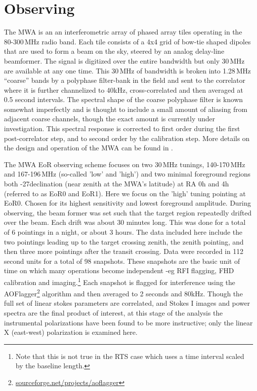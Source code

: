\documentclass[preprint]{aastex}
\begin{document}
\section{Observing}
\label{sec:observing}
The MWA is an an interferometric array of phased array tiles operating in the 80-300\,MHz radio band. Each tile consists of a 4x4 grid of bow-tie shaped dipoles that are used to form a beam on the sky, steered by an analog delay-line beamformer.  The signal is digitized over the entire bandwidth but only 30\,MHz are available at any one time.  This 30\,MHz of bandwidth is broken into 1.28\,MHz ``coarse'' bands by a polyphase filter-bank in the field and sent to the correlator where it is further channelized to 40kHz, cross-correlated and then averaged at 0.5 second intervals. The spectral shape of the coarse polyphase filter is known somewhat imperfectly and is thought to include a small amount of aliasing from adjacent coarse channels, though the exact amount is currently under investigation. This spectral response is corrected to first order during the first post-correlator step, and to second order by the calibration step.  More details on the design and operation of the MWA can be found in \cite{Tingay:2013p9022}.

The MWA EoR observing scheme focuses on two 30\,MHz tunings, 140-170\,MHz and 167-196\,MHz (so-called 'low' and 'high') and two minimal foreground regions both -27\arcdeg declination (near zenith at the MWA's latitude) at RA 0h and 4h (referred to as EoR0 and EoR1). Here we focus on the 'high' tuning pointing at EoR0.  Chosen for its highest sensitivity and lowest foreground amplitude. During observing, the beam former was set such that the target region repeatedly drifted over the beam.  Each drift was about 30 minutes long.  This was done for a total of 6 pointings in a night, or about 3 hours. The data included here include the two pointings leading up to the target crossing zenith, the zenith pointing, and then three more pointings after the transit crossing.  Data were recorded in 112 second units for a total of 98 snapshots. These snapshots are the basic unit of time on which many operations become independent -eg RFI flagging, FHD calibration and imaging.\footnote{Note that this is not true in the RTS case which uses a time interval scaled by the baseline length.}   Each snapshot is flagged for interference using the AOFlagger\footnote{\url{sourceforge.net/projects/aoflagger}} algorithm and then averaged to 2 seconds and 80kHz. Though the full set of linear stokes parameters are correlated, and Stokes I images and power spectra are the final product of interest, at this stage of the analysis the instrumental polarizations have been found to be more instructive; only the linear X (east-west) polarization is examined here.  
\end{document}
